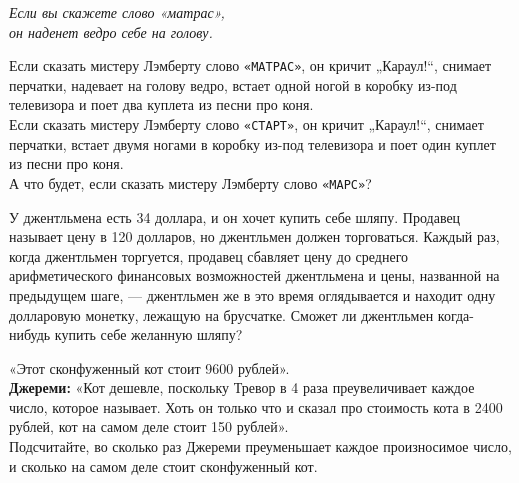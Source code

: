 ﻿

\begin{flushright} \itshape
Если вы скажете слово «матрас», \\
он наденет ведро себе на голову.
\end{flushright}

\begin{enumerate}
\itA Если сказать мистеру Лэмберту слово {\verb!«МАТРАС»!}, он кричит „Караул!“, снимает перчатки, надевает на голову ведро, встает одной ногой в коробку из-под телевизора и поет два куплета из песни про коня.\smallskip \\
Если сказать мистеру Лэмберту слово {\verb!«СТАРТ»!}, он кричит „Караул!“, снимает перчатки, встает двумя ногами в коробку из-под телевизора и поет один куплет из песни про коня.\smallskip \\
А что будет, если сказать мистеру Лэмберту слово {\verb!«МАРС»!}?

\itB У джентльмена есть 34 доллара, и он хочет купить себе шляпу. Продавец называет цену в 120 долларов, но джентльмен должен торговаться. Каждый раз, когда джентльмен торгуется, продавец сбавляет цену до среднего арифметического финансовых возможностей джентльмена и цены, названной на предыдущем шаге, — джентльмен же в это время оглядывается и находит одну долларовую монетку, лежащую на брусчатке. Сможет ли джентльмен когда-нибудь купить себе желанную шляпу?

 «Этот сконфуженный кот стоит 9600 рублей». \\
{\bfseries Джереми:} «Кот дешевле, поскольку Тревор в 4 раза преувеличивает каждое число, которое называет. Хоть он только что и сказал про стоимость кота в 2400 рублей, кот на самом деле стоит 150 рублей». \\
Подсчитайте, во сколько раз Джереми преуменьшает каждое произносимое число, и сколько на самом деле стоит сконфуженный кот.

\end{enumerate}